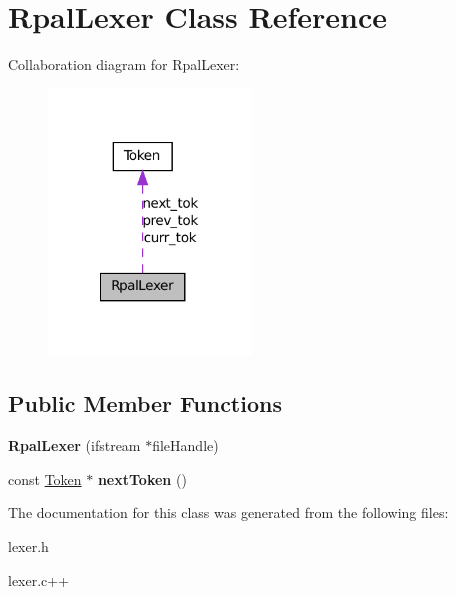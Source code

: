 \hypertarget{classRpalLexer}{
\section{RpalLexer Class Reference}
\label{classRpalLexer}
}


Collaboration diagram for RpalLexer:\nopagebreak
\begin{figure}[H]
\begin{center}
\leavevmode
\includegraphics[width=153pt]{classRpalLexer__coll__graph}
\end{center}
\end{figure}
\subsection*{Public Member Functions}
\begin{DoxyCompactItemize}
\item 
\hypertarget{classRpalLexer_a60edfae72ab9992fbff1f4867cb8614b}{
{\bfseries RpalLexer} (ifstream $\ast$fileHandle)}
\label{classRpalLexer_a60edfae72ab9992fbff1f4867cb8614b}

\item 
\hypertarget{classRpalLexer_af97ac9808131f59c9eadff33cd8fdcc3}{
const \hyperlink{classToken}{Token} $\ast$ {\bfseries nextToken} ()}
\label{classRpalLexer_af97ac9808131f59c9eadff33cd8fdcc3}

\end{DoxyCompactItemize}


The documentation for this class was generated from the following files:\begin{DoxyCompactItemize}
\item 
lexer.h\item 
lexer.c++\end{DoxyCompactItemize}
